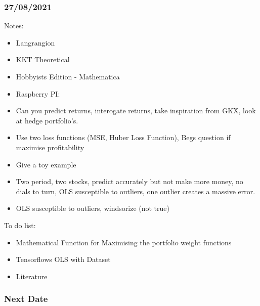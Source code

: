 \documentclass[10pt]{article}
\begin{document}
\subsubsection*{27/08/2021}
Notes:
\begin{itemize}
	\item Langrangion
	\item KKT Theoretical
	\item Hobbyists Edition - Mathematica
	\item Raspberry PI: 
	\item Can you predict returns, interogate returns, take inspiration from GKX, look at hedge portfolio's.
	\item Use two loss functions (MSE, Huber Loss Function), Begs question if maximise profitability
	\item Give a toy example
	\item Two period, two stocks, predict accurately but not make more money, no dials to turn, OLS susceptible to outliers, one outlier creates a massive error.
	\item OLS susceptible to outliers, windsorize (not true)
\end{itemize}
To do list:
\begin{itemize}
	\item Mathematical Function for Maximising the portfolio weight functions
	\item Tensorflows OLS with Dataset
	\item Literature
\end{itemize}
\subsubsection*{Next Date}
%
\printbibliography
\newpage
\end{document}

